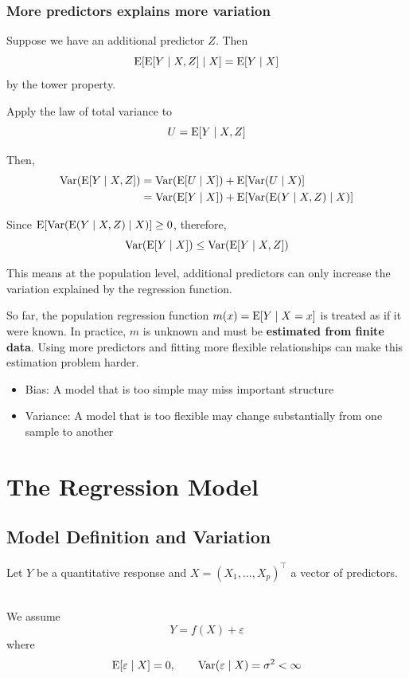 \subsubsection{More predictors explains more variation}
Suppose we have an additional predictor $Z$. Then
\begin{equation*}
    \operatorname{E}[\operatorname{E}[Y \mid X,Z] \mid X] = \operatorname{E}[Y \mid X]
\end{equation*}
by the tower property.

Apply the law of total variance to
\begin{equation*}
    U=\operatorname{E} [Y \mid X,Z]
\end{equation*}

Then,
\begin{align*}
    \operatorname{Var}(\operatorname{E}[Y \mid X,Z]) &= \operatorname{Var}(\operatorname{E}[U \mid X]) + \operatorname{E}[\operatorname{Var}(U \mid X)] \\
    &= \operatorname{Var}(\operatorname{E}[Y \mid X]) + \operatorname{E}[\operatorname{Var}(\operatorname{E}(Y \mid X,Z) \mid X)]
\end{align*}

Since $\operatorname{E}[\operatorname{Var}(\operatorname{E}(Y \mid X,Z) \mid X)] \geq 0$, therefore, 
\begin{equation*}
    \operatorname{Var}(\operatorname{E}[Y \mid X]) \leq \operatorname{Var}(\operatorname{E}[Y \mid X,Z])
\end{equation*}

This means at the population level, additional predictors can only increase the variation explained by the regression function. 

So far, the population regression function $m(x)=\operatorname{E}[Y \mid X =x]$ is treated as if it were known. In practice, $m$ is unknown and must be \textbf{estimated from finite data}. Using more predictors and fitting more flexible relationships can make this estimation problem harder.
\begin{itemize}
    \item Bias: A model that is too simple may miss important structure
    \item Variance: A model that is too flexible may change substantially from one sample to another
\end{itemize}

\section{The Regression Model}

\subsection{Model Definition and Variation}
Let $Y$ be a quantitative response and $X=(X_1,\dots,X_p)^\top$ a vector of predictors.
\begin{definition}\leavevmode \\
    We assume
    \begin{equation}\label{eq:homoregmodel}
        Y=f(X)+\varepsilon
    \end{equation}
    where
    \begin{equation*}
        \operatorname{E}[\varepsilon \mid X] = 0, \quad \quad \operatorname{Var}(\varepsilon \mid X) = \sigma^2 < \infty
    \end{equation*}
\end{definition}

